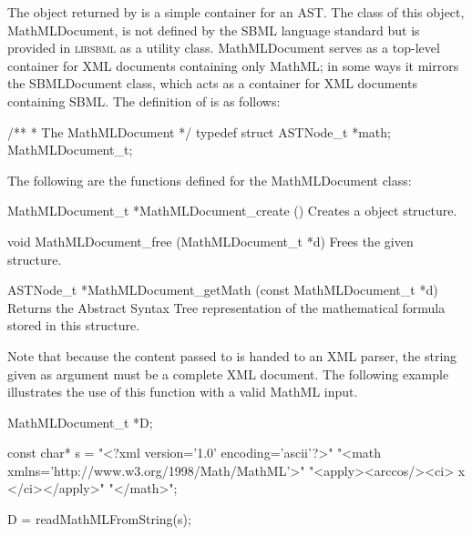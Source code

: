 \documentclass{cekmanual}
\newcommand{\libsbml}{\textsc{libsbml}}
\begin{document}
The object returned by  is a simple
container for an AST.  The class of this object, MathMLDocument, is not
defined by the SBML language standard but is provided in \libsbml{} as a
utility class.  MathMLDocument serves as a top-level container for XML
documents containing only MathML; in some ways it mirrors the SBMLDocument
class, which acts as a container for XML documents containing SBML.  The
definition of  is as follows:
 
\begin{example}[c]
/**
 * The MathMLDocument
 */
typedef struct
{
  ASTNode_t *math;
} MathMLDocument_t;
\end{example}  

The following are the functions defined for the MathMLDocument class:

\begin{methoddef}{MathMLDocument\_t *MathMLDocument\_create ()}
  Creates a  object structure.
\end{methoddef}

\begin{methoddef}{void MathMLDocument\_free (MathMLDocument\_t *d)}
  Frees the given  structure.
\end{methoddef}

\begin{methoddef}{ASTNode\_t *MathMLDocument\_getMath (const MathMLDocument\_t *d)}
  Returns the Abstract Syntax Tree representation of the mathematical
  formula stored in this  structure.
\end{methoddef}

Note that because the content passed to  is
handed to an XML parser, the string given as argument must be a complete
XML document.  The following example illustrates the use of this function
with a valid MathML input.

\begin{example}[c]
MathMLDocument_t *D;

const char* s = "<?xml version='1.0' encoding='ascii'?>"
                  "<math xmlns='http://www.w3.org/1998/Math/MathML'>"
                  "<apply><arccos/><ci> x </ci></apply>"
                  "</math>";

D = readMathMLFromString(s);
\end{example}


\end{document}
